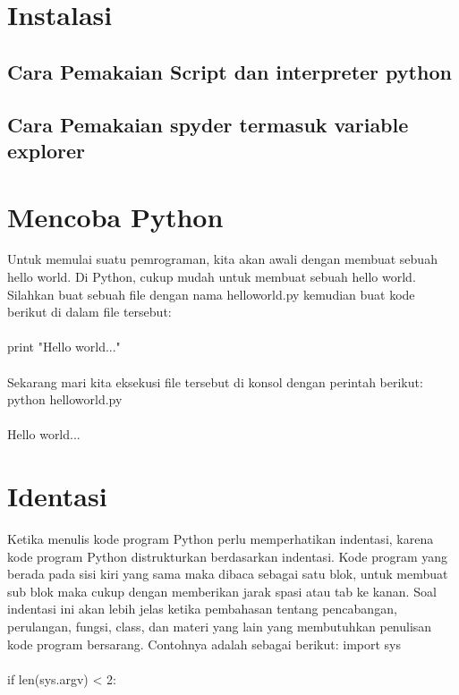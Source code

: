 \section{Instalasi}
\subsection{Cara Pemakaian Script dan interpreter python}
\subsection{Cara Pemakaian spyder termasuk variable explorer}

\section{Mencoba Python}
Untuk memulai suatu pemrograman, kita akan awali dengan membuat sebuah hello world. Di Python, cukup mudah untuk membuat sebuah hello world. Silahkan buat sebuah file dengan nama helloworld.py kemudian buat kode berikut di dalam file tersebut:
\paragraph{}
print "Hello world..."
\paragraph{}
Sekarang mari kita eksekusi file tersebut di konsol dengan perintah berikut:
python helloworld.py
\paragraph{}
Hello world...

\section{Identasi}
Ketika menulis kode program Python perlu memperhatikan indentasi, karena kode program Python distrukturkan berdasarkan indentasi. Kode program yang berada pada sisi kiri yang sama maka dibaca sebagai satu blok, untuk membuat sub blok maka cukup dengan memberikan jarak spasi atau tab ke kanan.
Soal indentasi ini akan lebih jelas ketika pembahasan tentang pencabangan, perulangan, fungsi, class, dan materi yang lain yang membutuhkan penulisan kode program bersarang.
Contohnya adalah sebagai berikut:
import sys
\paragraph{}
if len(sys.argv) < 2:
